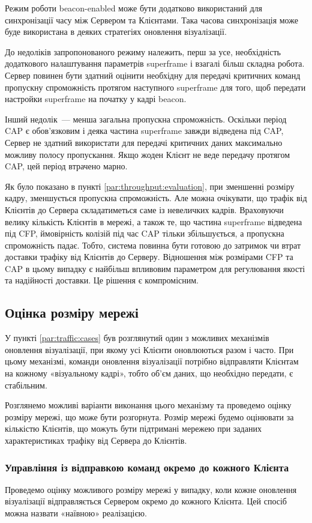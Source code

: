 \documentclass[a4paper,ukrainian,utf8,nocolumnsxix,floatsection,equationsection]{eskdtext}
\renewcommand\paragraph{\subsubsection}
\newcommand{\bem}[0]{beacon-enabled\xspace}
\begin{document}
Режим роботи \bem може бути додатково використаний для синхронізації часу між Сервером та Клієнтами. Така часова синхронізація може буде використана в деяких стратегіях оновлення візуалізації.

До недоліків запропонованого режиму належить, перш за усе, необхідність додаткового налаштування параметрів superframe і взагалі більш складна робота. Сервер повинен бути здатний оцінити необхідну для передачі критичних команд пропускну спроможність протягом наступного superframe для того, щоб передати настройки superframe на початку у кадрі beacon.

Інший недолік~--- менша загальна пропускна спроможність. Оскільки період CAP є обов'язковим і деяка частина superframe завжди відведена під CAP, Сервер не здатний використати для передачі критичних даних максимально можливу полосу пропускання. Якщо жоден Клієнт не веде передачу протягом CAP, цей період втрачено марно.

Як було показано в пункті \ref{par:throughput:evaluation}, при зменшенні розміру кадру, зменшується пропускна спроможність. Але можна очікувати, що трафік від Клієнтів до Сервера складатиметься саме із невеличких кадрів. Враховуючи велику кількість Клієнтів в мережі, а також те, що частина superframe відведена під CFP, ймовірність колізій під час CAP тільки збільшується, а пропускна спроможність падає. Тобто, система повинна бути готовою до затримок чи втрат доставки трафіку від Клієнтів до Серверу. Відношення між розмірами CFP та CAP в цьому випадку є найбільш впливовим параметром для регулювання якості та надійності доставки. Це рішення є компромісним.

\subsection{Оцінка розміру мережі}

У пункті \ref{par:traffic:cases} був розглянутий один з можливих механізмів оновлення візуалізації, при якому усі Клієнти оновлюються разом і часто. При цьому механізмі, команди оновлення візуалізації потрібно відправляти Клієнтам на кожному «візуальному кадрі», тобто об'єм даних, що необхідно передати, є стабільним. 

Розглянемо можливі варіанти виконання цього механізму та проведемо оцінку розміру мережі, що може бути розгорнута. Розмір мережі будемо оцінювати за кількістю Клієнтів, що можуть бути підтримані мережею при заданих характеристиках трафіку від Сервера до Клієнтів.

\paragraph{Управління із відправкою команд окремо до кожного Клієнта}
\label{par:individual:send}
Проведемо оцінку можливого розміру мережі у випадку, коли кожне оновлення візуалізації відправляється Сервером окремо до кожного Клієнта. Цей спосіб можна назвати «наївною» реалізацією.
\end{document}

